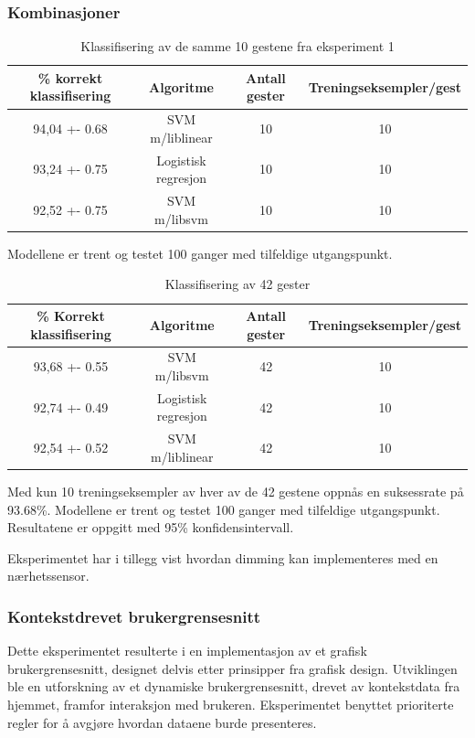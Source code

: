 \subsubsection*{Kombinasjoner}
\begin{table}[h!]
\centering
\begin{tabular}{|| c c c c ||}
\hline
\% korrekt klassifisering & Algoritme & Antall gester & Treningseksempler/gest \\ [0.5ex] 
 \hline\hline
 94,04 +- 0.68 & SVM m/liblinear & 10 & 10 \\
 \hline
 93,24 +- 0.75 & Logistisk regresjon & 10 & 10 \\
 \hline
 92,52 +- 0.75 & SVM m/libsvm & 10 & 10 \\ 
 \hline
\end{tabular}
\caption{Klassifisering av de samme 10 gestene fra eksperiment 1}
\label{table:results-foursensors}
\end{table}
Modellene er trent og testet 100 ganger med tilfeldige utgangspunkt.
\begin{table}[h!]
\centering
\begin{tabular}{|| c c c c ||}
\hline
\% Korrekt klassifisering & Algoritme & Antall gester & Treningseksempler/gest\\ [0.5ex] 
 \hline\hline
 93,68 +- 0.55 & SVM m/libsvm & 42 & 10 \\ 
 \hline
 92,74 +- 0.49 & Logistisk regresjon & 42 & 10 \\
 \hline
 92,54 +- 0.52 & SVM m/liblinear & 42 & 10 \\[1ex]
 \hline
\end{tabular}
\caption{Klassifisering av 42 gester}
\label{table:results-foursensors-42}
\end{table}
Med kun 10 treningseksempler av hver av de 42 gestene oppnås en suksessrate på 93.68\%. Modellene er trent og testet 100 ganger med tilfeldige utgangspunkt. Resultatene er oppgitt med 95\% konfidensintervall.

Eksperimentet har i tillegg vist hvordan dimming kan implementeres med en nærhetssensor.

\subsubsection*{Kontekstdrevet brukergrensesnitt}
Dette eksperimentet resulterte i en implementasjon av et grafisk brukergrensesnitt, designet delvis etter prinsipper fra grafisk design. Utviklingen ble en utforskning av et dynamiske brukergrensesnitt, drevet av kontekstdata fra hjemmet, framfor interaksjon med brukeren. Eksperimentet benyttet prioriterte regler for å avgjøre hvordan dataene burde presenteres.